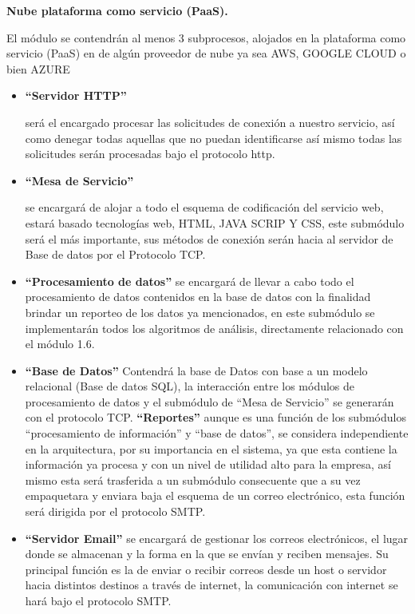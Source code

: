 \textbf{Nube plataforma como servicio (PaaS).}

El módulo  se contendrán al menos 3 subprocesos, alojados en la plataforma como servicio (PaaS) en de algún proveedor de nube ya sea AWS, GOOGLE CLOUD o bien AZURE 
\begin{itemize}

\item \textbf{“Servidor HTTP” }

 será el encargado procesar las solicitudes de conexión a nuestro servicio, así como denegar todas aquellas que no puedan identificarse así mismo todas las solicitudes serán procesadas bajo el protocolo http.
 
\item \textbf{“Mesa de Servicio” }

se encargará de alojar a todo el esquema de codificación del servicio web, estará basado tecnologías web, HTML, JAVA SCRIP Y CSS, este submódulo será el más importante, sus métodos de conexión serán hacia al servidor de Base de datos por el Protocolo TCP.
\item \textbf{“Procesamiento de datos” }
se encargará de llevar a cabo todo el procesamiento de datos contenidos en la base de datos con la finalidad brindar un reporteo de los datos ya mencionados, en este submódulo se implementarán todos los algoritmos de análisis, directamente relacionado con el módulo 1.6.

\item \textbf{“Base de Datos” }
Contendrá la base de Datos con base a un modelo relacional (Base de datos SQL), la interacción entre los módulos de procesamiento de datos y el submódulo de “Mesa de Servicio” se generarán con el protocolo TCP.
\textbf{“Reportes”}
 aunque es una función de los submódulos “procesamiento de información” y “base de datos”, se considera independiente en la arquitectura, por su importancia en el sistema, ya que esta contiene la información ya procesa y con un nivel de utilidad alto para la empresa, así mismo esta   será trasferida a  un submódulo consecuente que a su vez empaquetara y enviara baja el esquema de un correo electrónico, esta función será dirigida por el protocolo SMTP.

\item  \textbf{“Servidor Email”} se encargará de gestionar los correos electrónicos, el lugar donde se almacenan y la forma en la que se envían y reciben mensajes. Su principal función es la de enviar o recibir correos desde un host o servidor hacia distintos destinos a través de internet, la comunicación con internet se hará bajo el protocolo SMTP.

\end{itemize}


